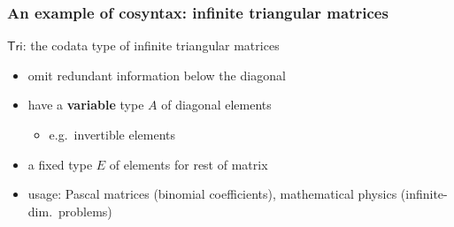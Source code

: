 \documentclass[
]
{beamer}
\newcommand{\constfont}[1]{\ensuremath{\mathsf{#1}}}
\newcommand{\Tri}{\constfont{Tri}}
\newcommand{\fat}[1]{\textbf{#1}}
\begin{document}
\begin{frame}
 \frametitle{An example of cosyntax: infinite triangular matrices}
 
   \begin{block}{\Tri: the codata type of infinite triangular matrices}
     \begin{itemize}
      \item omit redundant information below the diagonal
      \item have a \fat{variable} type $A$ of diagonal elements 
        \begin{itemize} 
          \item e.g.\ invertible elements
        \end{itemize}
      \item a fixed type $E$ of elements for rest of matrix
      \item usage: Pascal matrices (binomial coefficients), mathematical physics (infinite-dim.\ problems)
     \end{itemize}
   \end{block}
   
   
\begin{center}
   
 
%

\end{center}
 

   
\end{frame}
\end{document}
